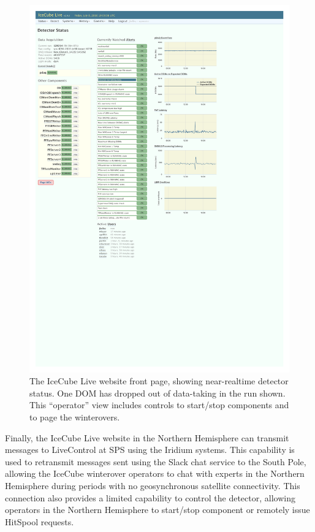 \begin{figure}[!ht]
 \centering
 \includegraphics[width=1.0\textwidth]{graphics/online/live/live_screenshot_cropped.pdf}
 \caption{The IceCube Live website front page, showing near-realtime detector
   status.  One DOM has dropped out of data-taking in the run shown.  This
   ``operator'' view includes controls to start/stop components and to page
   the winterovers.} 
 \label{fig:live_screenshot}
\end{figure}

Finally, the IceCube Live website in the Northern Hemisphere can transmit
messages to LiveControl at SPS using the Iridium systems.  This capability
is used to retransmit messages sent using the Slack chat service to the
South Pole, allowing the IceCube winterover operators to chat with experts in the
Northern Hemisphere during periods with no geosynchronous satellite
connectivity.  This connection also provides a limited capability to
control the detector, allowing operators in the Northern Hemisphere to
start/stop component or remotely issue HitSpool requests.

